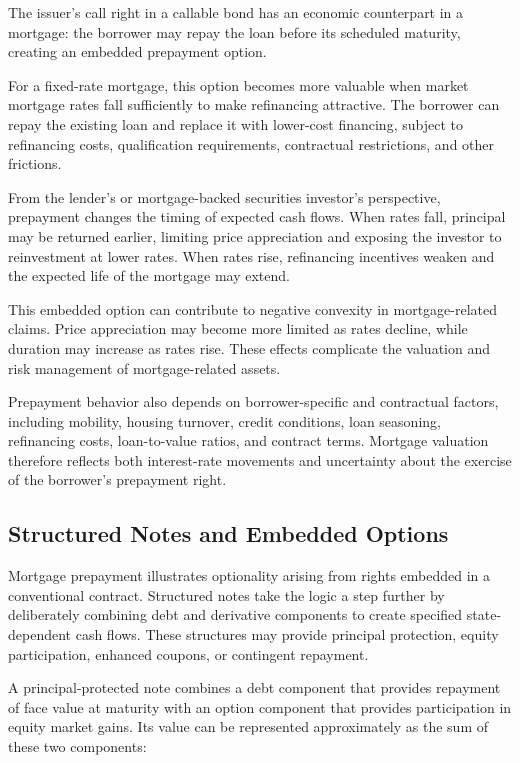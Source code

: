 The issuer's call right in a callable bond has an economic counterpart in a mortgage: the borrower may repay the loan before its scheduled maturity, creating an embedded prepayment option.

For a fixed-rate mortgage, this option becomes more valuable when market mortgage rates fall sufficiently to make refinancing attractive. The borrower can repay the existing loan and replace it with lower-cost financing, subject to refinancing costs, qualification requirements, contractual restrictions, and other frictions.

From the lender's or mortgage-backed securities investor's perspective, prepayment changes the timing of expected cash flows. When rates fall, principal may be returned earlier, limiting price appreciation and exposing the investor to reinvestment at lower rates. When rates rise, refinancing incentives weaken and the expected life of the mortgage may extend.

This embedded option can contribute to negative convexity
in mortgage-related claims. Price appreciation may become
more limited as rates decline, while duration may increase
as rates rise. These effects complicate the valuation and
risk management of mortgage-related assets.

Prepayment behavior also depends on borrower-specific and
contractual factors, including mobility, housing turnover,
credit conditions, loan seasoning, refinancing costs,
loan-to-value ratios, and contract terms. Mortgage valuation therefore reflects both interest-rate movements and uncertainty about the exercise of the borrower's
prepayment right.


\subsection{Structured Notes and Embedded Options}

Mortgage prepayment illustrates optionality arising from rights embedded in a conventional contract. Structured notes take the logic a step further by deliberately combining debt and derivative components to create specified state-dependent cash flows. These structures may provide principal protection, equity participation, enhanced coupons, or contingent repayment.

A principal-protected note combines a debt component that
provides repayment of face value at maturity with an
option component that provides participation in equity
market gains. Its value can be represented approximately
as the sum of these two components:

